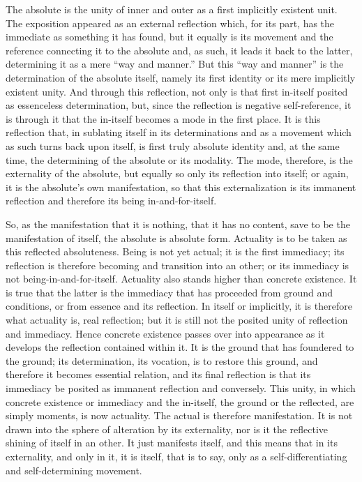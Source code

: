 The absolute is the unity of inner and outer
as a first implicitly existent unit.
The exposition appeared as an external reflection
which, for its part, has the immediate as something it has found,
but it equally is its movement and
the reference connecting it to the absolute
and, as such, it leads it back to the latter,
determining it as a mere “way and manner.”
But this “way and manner” is the determination of the absolute itself,
namely its first identity or its mere implicitly existent unity.
And through this reflection, not only is that
first in-itself posited as essenceless determination,
but, since the reflection is negative self-reference,
it is through it that the in-itself becomes
a mode in the first place.
It is this reflection that,
in sublating itself in its determinations
and as a movement which as such turns back upon itself,
is first truly absolute identity
and, at the same time, the determining of
the absolute or its modality.
The mode, therefore, is the externality of the absolute,
but equally so only its reflection into itself;
or again, it is the absolute's own manifestation,
so that this externalization is its immanent reflection
and therefore its being in-and-for-itself.

So, as the manifestation that it is nothing,
that it has no content, save to be the manifestation of itself,
the absolute is absolute form.
Actuality is to be taken as this reflected absoluteness.
Being is not yet actual;
it is the first immediacy;
its reflection is therefore becoming
and transition into an other;
or its immediacy is not being-in-and-for-itself.
Actuality also stands higher than concrete existence.
It is true that the latter is the immediacy
that has proceeded from ground and conditions,
or from essence and its reflection.
In itself or implicitly, it is therefore
what actuality is, real reflection;
but it is still not the posited unity of reflection and immediacy.
Hence concrete existence passes over into appearance
as it develops the reflection contained within it.
It is the ground that has foundered to the ground;
its determination, its vocation, is to restore this ground,
and therefore it becomes essential relation,
and its final reflection is that its
immediacy be posited as immanent reflection and conversely.
This unity, in which concrete existence
or immediacy and the in-itself,
the ground or the reflected, are simply moments,
is now actuality.
The actual is therefore manifestation.
It is not drawn into the sphere of alteration by its externality,
nor is it the reflective shining of itself in an other.
It just manifests itself, and this means that in its externality,
and only in it, it is itself, that is to say,
only as a self-differentiating and self-determining movement.

